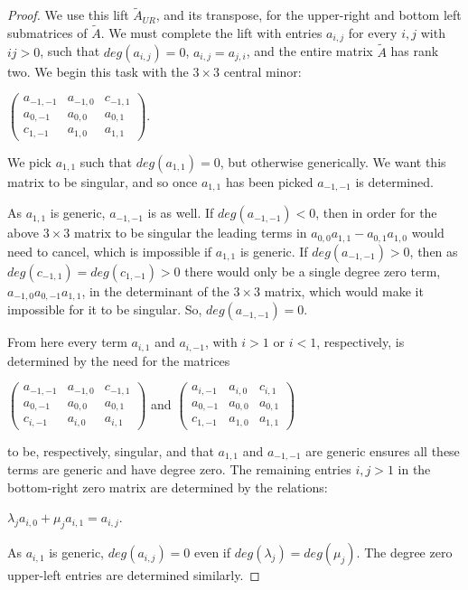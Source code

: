 \documentclass{article}
\begin{document}
\begin{proof}
  We use this lift $\tilde{A}_{UR}$, and its transpose, for the upper-right and bottom left submatrices of $\tilde{A}$. We must complete the lift with entries $a_{i,j}$ for every $i,j$ with $ij > 0$, such that $deg(a_{i,j}) = 0$, $a_{i,j} = a_{j,i}$, and the entire matrix $\tilde{A}$ has rank two. We begin this task with the $3 \times 3$ central minor:

  \begin{center}
    $\left(\begin{array}{ccc} a_{-1,-1} & a_{-1,0} & c_{-1,1} \\ a_{0,-1} & a_{0,0} & a_{0,1} \\ c_{1,-1} & a_{1,0} & a_{1,1} \end{array}\right)$.
  \end{center}
  
  We pick $a_{1,1}$ such that $deg(a_{1,1}) = 0$, but otherwise generically. We want this matrix to be singular, and so once $a_{1,1}$ has been picked $a_{-1,-1}$ is determined. 

  As $a_{1,1}$ is generic, $a_{-1,-1}$ is as well. If $deg(a_{-1,-1}) < 0$, then in order for the above $3 \times 3$ matrix to be singular the leading terms in $a_{0,0}a_{1,1}-a_{0,1}a_{1,0}$ would need to cancel, which is impossible if $a_{1,1}$ is generic. If $deg(a_{-1,-1}) > 0$, then as $deg(c_{-1,1}) = deg(c_{1,-1}) > 0$ there would only be a single degree zero term, $a_{-1,0}a_{0,-1}a_{1,1}$, in the determinant of the $3 \times 3$ matrix, which would make it impossible for it to be singular. So, $deg(a_{-1,-1}) = 0$. 

  From here every term $a_{i,1}$ and $a_{i,-1}$, with $i > 1$ or $i < 1$, respectively, is determined by the need for the matrices
  \begin{center}
    $\left(\begin{array}{ccc} a_{-1,-1} & a_{-1,0} & c_{-1,1} \\ a_{0,-1} & a_{0,0} & a_{0,1} \\ c_{i,-1} & a_{i,0} & a_{i,1} \end{array}\right)$ \hspace{.1 in} and \hspace{.1 in} $\left(\begin{array}{ccc} a_{i,-1} & a_{i,0} & c_{i,1} \\ a_{0,-1} & a_{0,0} & a_{0,1} \\ c_{1,-1} & a_{1,0} & a_{1,1} \end{array}\right)$
  \end{center}
  to be, respectively, singular, and that $a_{1,1}$ and $a_{-1,-1}$ are generic ensures all these terms are generic and have degree zero. The remaining entries $i,j > 1$ in the bottom-right zero matrix are determined by the relations:
  \begin{center}
    $\lambda_{j}a_{i,0} + \mu_{j}a_{i,1} = a_{i,j}$.
  \end{center}
  As $a_{i,1}$ is generic, $deg(a_{i,j}) = 0$ even if $deg(\lambda_{j}) = deg(\mu_{j})$. The degree zero upper-left entries are determined similarly.
  

\end{proof}
\end{document}
